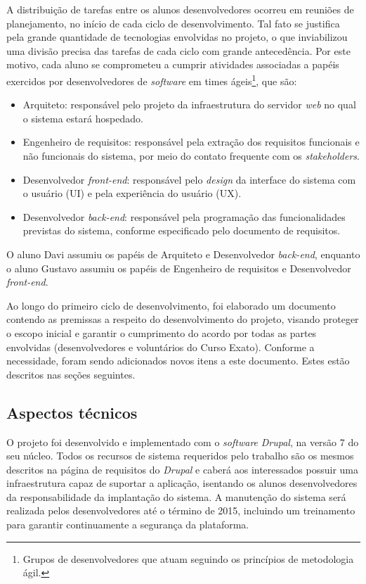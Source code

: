 \documentclass[a4paper]{article}
\begin{document}
A distribuição de tarefas entre os alunos desenvolvedores ocorreu em reuniões de planejamento, no início de cada ciclo de desenvolvimento. Tal fato se justifica pela grande quantidade de tecnologias envolvidas no projeto, o que inviabilizou uma divisão precisa das tarefas de cada ciclo com grande antecedência. Por este motivo, cada aluno se comprometeu a cumprir atividades associadas a papéis exercidos por desenvolvedores de \textit{software} em times ágeis\footnote{Grupos de desenvolvedores que atuam seguindo os princípios de metodologia ágil.}, que são:
\begin{itemize}
\item Arquiteto: responsável pelo projeto da infraestrutura do servidor \textit{web} no qual o sistema estará hospedado.
\item Engenheiro de requisitos: responsável pela extração dos requisitos funcionais e não funcionais do sistema, por meio do contato frequente com os \textit{stakeholders}.
\item Desenvolvedor \textit{front-end}: responsável pelo \textit{design} da interface do sistema com o usuário (UI) e pela experiência do usuário (UX).
\item Desenvolvedor \textit{back-end}: responsável pela programação das funcionalidades previstas do sistema, conforme especificado pelo documento de requisitos.
\end{itemize}

O aluno Davi assumiu os papéis de Arquiteto e Desenvolvedor \textit{back-end}, enquanto o aluno Gustavo assumiu os papéis de Engenheiro de requisitos e Desenvolvedor \textit{front-end}.

Ao longo do primeiro ciclo de desenvolvimento, foi elaborado um documento contendo as premissas a respeito do desenvolvimento do projeto, visando proteger o escopo inicial e garantir o cumprimento do acordo por todas as partes envolvidas (desenvolvedores e voluntários do Curso Exato). Conforme a necessidade, foram sendo adicionados novos itens a este documento. Estes estão descritos nas seções seguintes.

\subsection{Aspectos técnicos}

O projeto foi desenvolvido e implementado com o \textit{software} \textit{Drupal}, na versão 7 do seu núcleo. Todos os recursos de sistema requeridos pelo trabalho são os mesmos descritos na página de requisitos do \textit{Drupal} \cite{requirements} e caberá aos interessados possuir uma infraestrutura capaz de suportar a aplicação, isentando os alunos desenvolvedores da responsabilidade da implantação do sistema. A manutenção do sistema será realizada pelos desenvolvedores até o término de 2015, incluindo um treinamento para garantir continuamente a segurança da plataforma.
\end{document}
